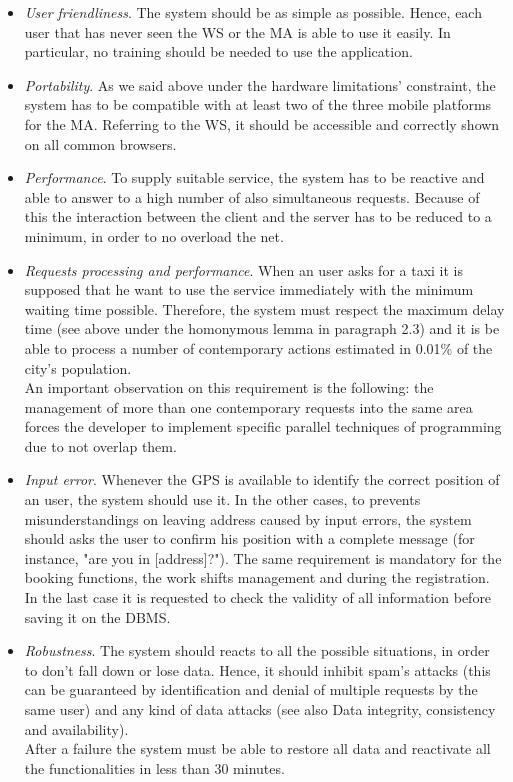 \begin{itemize}
	\item \textit{User friendliness}. The system should be as simple as possible. Hence, each user that has never seen the WS or the MA is able to use it easily. In particular, no training should be needed to use the application.

	\item \textit{Portability}. As we said above under the hardware limitations' constraint, the system has to be compatible with at least two of the three mobile platforms for the MA. Referring to the WS, it should be accessible and correctly shown on all common browsers.

	\item \textit{Performance}. To supply suitable service, the system has to be reactive and able to answer to a high number of also simultaneous requests. Because of this the interaction between the client and the server has to be reduced to a minimum, in order to no overload the net.
	
	\item \textit{Requests processing and performance}. When an user asks for a taxi it is supposed that he want to use the service immediately with the minimum waiting time possible. Therefore, the system must respect the maximum delay time (see above under the homonymous lemma in paragraph 2.3) and it is be able to process a number of contemporary actions estimated in 0.01\% of the city's population.\\
An important observation on this requirement is the following: the management of more than one contemporary requests into the same area forces the developer to implement specific parallel techniques of programming due to not overlap them.

	\item \textit{Input error}. Whenever the GPS is available to identify the correct position of an user, the system should use it. In the other cases, to prevents misunderstandings on leaving address caused by input errors, the system should asks the user to confirm his position with a complete message (for instance, "are you in [address]?"). The same requirement is mandatory for the booking functions, the work shifts management and during the registration. In the last case it is requested to check the validity of all information before saving it on the DBMS.

	\item \textit{Robustness}. The system should reacts to all the possible situations, in order to don't fall down or lose data. Hence, it should inhibit spam's attacks (this can be guaranteed by identification and denial of multiple requests by the same user) and any kind of data attacks (see also Data integrity, consistency and availability).\\
After a failure the system must be able to restore all data and reactivate all the functionalities in less than 30 minutes.


\end{itemize}
